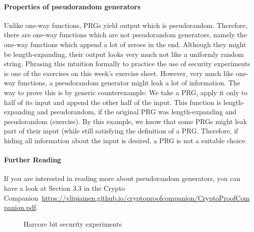 \documentclass[a4paper,table,dvipsnames]{article}
\theoremstyle{definition}
\begin{document}
\paragraph{Properties of pseudorandom generators}
Unlike one-way functions, PRGs yield output which is pseudorandom. Therefore, there are one-way functions which are not pseudorandom
generators, namely the one-way functions which append a lot of zeroes in the end. Although they might be length-expanding, their output
looks very much not like a uniformly random string. Phrasing this intuition formally to practice the use of security experiments is one
of the exercises on this week's exercise sheet. However, very much like one-way functions, a pseudorandom generator might leak a lot of information. The way to prove this is by generic counterexample: We take a PRG, apply it only to half of its input and append the other
half of the input. This function is length-expanding and pseudorandom, if the original PRG was length-expanding and pseudorandom (exercise).
By this example, we know that some PRGs might leak part of their input (while still satisfying the definition of a PRG. Therefore, if
hiding all information about the input is desired, a PRG is not a suitable choice.

\paragraph{Further Reading} If you are interested in reading more about pseudorandom generators, you can have a look at Section 3.3 in the Crypto Companion~\url{https://vlipiainen.github.io/cryptoproofcompanion/CryptoProofCompanion.pdf}.

\begin{wrapfigure}{R}{0.45\textwidth}
\vspace{-0.6cm}
\begin{center}
  \begin{pchstack}
  \pchspace
  \end{pchstack}
  \end{center}
\vspace{-0.6cm}
\caption{\label{fig:hb}Harcore bit security experiments}
\vspace{-0.3cm}
\end{wrapfigure}
\end{document}
